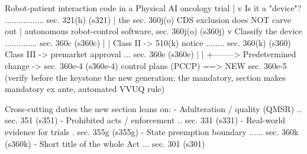 \begin{asciifig}
Robot-patient interaction code in a Physical AI oncology trial
      |
      v
Is it a "device"?  .................  sec. 321(h)            (s321)
      |  the sec. 360j(o) CDS exclusion does NOT carve out
      |  autonomous robot-control software, sec.    360j(o)  (s360j)
      v
Classify the device  ..............   sec. 360c              (s360c)
      |                                  |
Class II -> 510(k) notice  ........   sec. 360(k)            (s360)
Class III -> premarket approval ...   sec. 360e              (s360e)
      |                                  | 
      +--------> Predetermined change ->       sec. 360e-4   (s360e-4)
                 control plans (PCCP) ==> NEW  sec. 360e-5   (verify before
                 the keystone the new          generation; the mandatory,
                 section makes mandatory       ex ante, automated VVUQ rule)
      
Cross-cutting duties the new section leans on:
 - Adulteration / quality (QMSR)  ..   sec. 351              (s351)
 - Prohibited acts / enforcement  ..   sec. 331              (s331)
 - Real-world evidence for trials  .   sec. 355g             (s355g)
 - State preemption boundary  ......   sec. 360k             (s360k)
 - Short title of the whole Act  ...   sec. 301              (s301)
\end{asciifig}
\vspace{-0.8cm}

